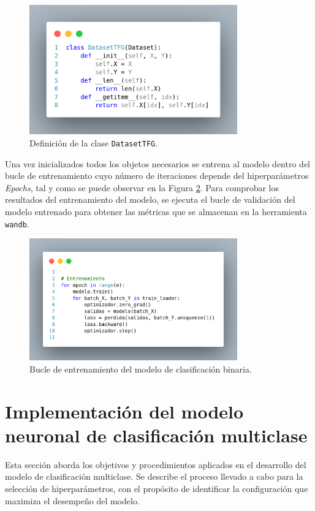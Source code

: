 \begin{figure}[H]
    \centering
    \includegraphics[width=0.8\textwidth]{./img/modelo/codigo/DatasetTFG.png}
    \caption{Definición de la clase \texttt{DatasetTFG}.}
    \label{fig:DatasetTFG}
\end{figure}

Una vez inicializados todos los objetos necesarios se entrena al modelo dentro del bucle de entrenamiento cuyo número de iteraciones depende del hiperparámetros \textit{Epochs}, tal y como se puede observar en la Figura \ref{fig:EntrenamientoCVBIN}. Para comprobar los resultados del entrenamiento del modelo, se ejecuta el bucle de validación del modelo entrenado para obtener las métricas que se almacenan en la herramienta \texttt{wandb}.



\begin{figure}[H]
    \centering
    \includegraphics[width=0.8\textwidth]{./img/modelo/codigo/EntrenamientoCVBIN.png}
    \caption{Bucle de entrenamiento del modelo de clasificación binaria.}
    \label{fig:EntrenamientoCVBIN}
\end{figure}



\section{Implementación del modelo neuronal de clasificación multiclase}
Esta sección aborda los objetivos y procedimientos aplicados en el desarrollo del modelo de clasificación multiclase. Se describe el proceso llevado a cabo para la selección de hiperparámetros, con el propósito de identificar la configuración que maximiza el desempeño del modelo.

